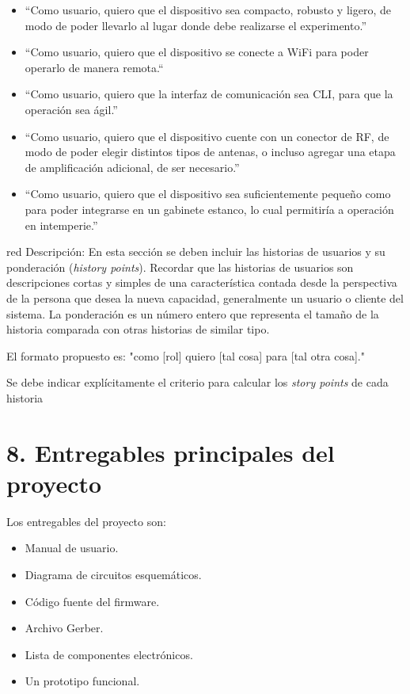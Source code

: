 \documentclass[
11pt, %
codirector, %
]{charter}
\begin{document}
\begin{itemize}
	\item “Como usuario, quiero que el dispositivo sea compacto, robusto y ligero, de modo de poder llevarlo al lugar donde debe realizarse el experimento.”
	\item “Como usuario, quiero que el dispositivo se conecte a WiFi para poder operarlo de manera remota.“
	\item “Como usuario, quiero que la interfaz de comunicación sea CLI, para que la operación sea ágil.”
	\item “Como usuario, quiero que el dispositivo cuente con un conector de RF, de modo de poder elegir distintos tipos de antenas, o incluso agregar una etapa de amplificación adicional, de ser necesario.”
	\item “Como usuario, quiero que el dispositivo sea suficientemente pequeño como para poder integrarse en un gabinete estanco, lo cual permitiría a operación en intemperie.”
\end{itemize}


\begin{consigna}{red}
Descripción: En esta sección se deben incluir las historias de usuarios y su ponderación (\textit{history points}). Recordar que las historias de usuarios son descripciones cortas y simples de una característica contada desde la perspectiva de la persona que desea la nueva capacidad, generalmente un usuario o cliente del sistema. La ponderación es un número entero que representa el tamaño de la historia comparada con otras historias de similar tipo.

El formato propuesto es: "como [rol] quiero [tal cosa] para [tal otra cosa]."

Se debe indicar explícitamente el criterio para calcular los \textit{story points} de cada historia
\end{consigna}

\section{8. Entregables principales del proyecto}
\label{sec:entregables}

Los entregables del proyecto son:
\begin{itemize}
	\item Manual de usuario.
	\item Diagrama de circuitos esquemáticos.
	\item Código fuente del firmware.
	\item Archivo Gerber.
	\item Lista de componentes electrónicos.
	\item Un prototipo funcional.
\end{itemize}
\end{document}
